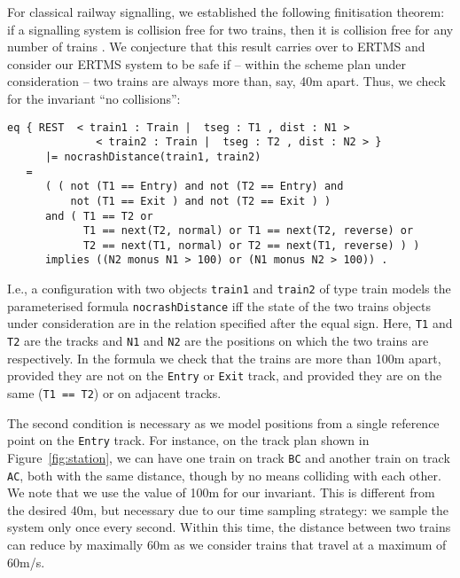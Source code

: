 For classical railway signalling, we established the following
finitisation theorem: if a signalling system is collision free for two
trains, then it is collision free for any number of
trains \cite{sttt14}. We conjecture that this result carries over to
ERTMS and consider our ERTMS system to be safe if -- within the scheme
plan under consideration -- two trains are always more than, say, 40m
apart. Thus, we check for the invariant ``no collisions'':
%
\begin{lstlisting}[columns=fixed]
   eq { REST  < train1 : Train |  tseg : T1 , dist : N1 >
              < train2 : Train |  tseg : T2 , dist : N2 > }
      |= nocrashDistance(train1, train2) 
   =
      ( ( not (T1 == Entry) and not (T2 == Entry) and 
          not (T1 == Exit ) and not (T2 == Exit ) ) 
      and ( T1 == T2 or 
            T1 == next(T2, normal) or T1 == next(T2, reverse) or
            T2 == next(T1, normal) or T2 == next(T1, reverse) ) )
      implies ((N2 monus N1 > 100) or (N1 monus N2 > 100)) .
\end{lstlisting}
%
I.e., a configuration with two objects \verb|train1| and \verb|train2| of type
 train models the parameterised formula \verb|nocrashDistance| iff the
 state of the two trains objects under consideration are in the
 relation specified after the equal sign. Here, \verb|T1|
 and \verb|T2| are the tracks and \verb|N1| and
\verb|N2| are the positions on which the two trains are respectively.
In the formula we check that the trains are more than 100m apart,
provided 
%
they are not on the \verb|Entry| or \verb|Exit| track, and
%
provided they are on the same (\verb|T1 == T2|) or on adjacent tracks.

The second condition is necessary as we model positions from a single
reference point on the \verb|Entry| track. For instance, on the track
plan shown in Figure~\ref{fig:station}, we can have one train on track
\verb|BC| and another train on track \verb|AC|, both with the same
distance, though by no means colliding with each other.
%
We note that we use the value of 100m for our invariant. This is different
from the desired 40m, but necessary due to our time sampling
strategy: we sample the system only once every
second. Within this time, the distance between two trains can reduce
by maximally 60m as we consider trains that travel at a
maximum of 60m/s.

